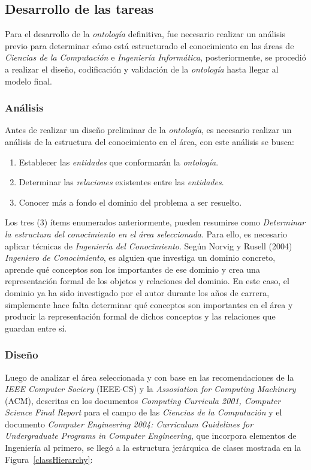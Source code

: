 \begin{itemize}
\subsection{Desarrollo de las tareas}
Para el desarrollo de la \textit{ontología} definitiva, fue necesario realizar un análisis previo para determinar cómo está estructurado el conocimiento en las áreas de \textit{Ciencias de la Computación} e \textit{Ingeniería Informática}, posteriormente, se procedió a realizar el diseño, codificación y validación de la \textit{ontología} hasta llegar al modelo final.

\subsubsection{Análisis}
Antes de realizar un diseño preliminar de la \textit{ontología}, es necesario realizar un análisis de la estructura del conocimiento en el área, con este análisis se busca:

\begin{enumerate}
    \item Establecer las \textit{entidades} que conformarán la \textit{ontología}.
    \item Determinar las \textit{relaciones} existentes entre las \textit{entidades}.
    \item Conocer más a fondo el dominio del problema a ser resuelto.
\end{enumerate}

Los tres (3) ítems enumerados anteriormente, pueden resumirse como \textit{Determinar la estructura del conocimiento en el área seleccionada}. Para ello, es necesario aplicar técnicas de \textit{Ingeniería del Conocimiento}. Según Norvig y Rusell (2004) \textit{Ingeniero de Conocimiento}, es alguien que investiga un dominio concreto, aprende qué conceptos son los importantes de ese dominio y crea una representación formal de los objetos y relaciones del dominio. En este caso, el dominio ya ha sido investigado por el autor durante los años de carrera, simplemente hace falta determinar qué conceptos son importantes en el área y producir la representación formal de dichos conceptos y las relaciones que guardan entre sí.

\subsubsection{Diseño}
Luego de analizar el área seleccionada y con base en las recomendaciones de la \textit{IEEE Computer Sociery} (IEEE-CS) y la \textit{Assosiation for Computing Machinery} (ACM), descritas en los documentos \textit{Computing Curricula 2001, Computer Science Final Report} para el campo de las \textit{Ciencias de la Computación} y el documento \textit{Computer Engineering 2004: Curriculum Guidelines for Undergraduate Programs in Computer Engineering}, que incorpora elementos de Ingeniería al primero, se llegó a la estructura jerárquica de clases mostrada en la Figura~\ref{classHierarchy}:


\end{itemize}
